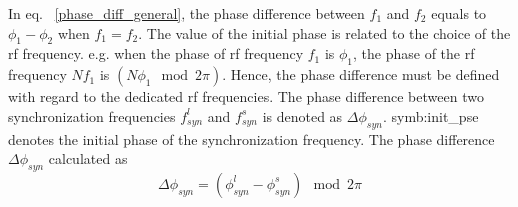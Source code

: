 In eq. ~\ref{phase_diff_general}, the phase difference between $f_1$ and $f_2$ equals to $\phi_1-\phi_2$ when $f_1=f_2$. The value of the initial phase is related to the choice of the rf frequency. e.g. when the phase of rf frequency $f_1$ is $\phi_1$, the phase of the rf frequency $Nf_1$ is $(N\phi_1 \mod 2\pi)$. Hence, the phase difference must be defined with regard to the dedicated rf frequencies. The phase difference between two synchronization frequencies $f_{\mathit{syn}}^{l}$ and $f_{\mathit{syn}}^{s}$ is denoted as $\Delta \phi_\mathit{syn}$. \gls{symb:init_pse} denotes the initial phase of the synchronization frequency. The phase difference $\Delta \phi_\mathit{syn}$ calculated as
\begin{equation}
\label{phase_diff_cir_int1}
	\Delta \phi_\mathit{syn}=(\phi^l_\mathit{syn}-\phi^s_\mathit{syn}) \mod 2\pi
\end{equation}

